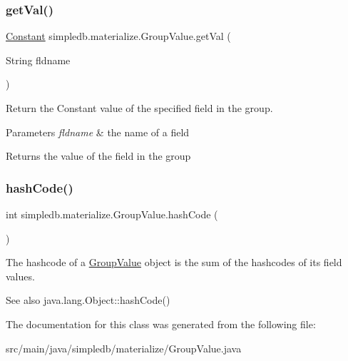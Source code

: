 \subsubsection{\texorpdfstring{get\+Val()}{getVal()}}
{\footnotesize\ttfamily \hyperlink{classsimpledb_1_1query_1_1Constant}{Constant} simpledb.\+materialize.\+Group\+Value.\+get\+Val (\begin{DoxyParamCaption}\item[{String}]{fldname }\end{DoxyParamCaption})\hspace{0.3cm}{\ttfamily [inline]}}

Return the Constant value of the specified field in the group. 
\begin{DoxyParams}{Parameters}
{\em fldname} & the name of a field \\
\hline
\end{DoxyParams}
\begin{DoxyReturn}{Returns}
the value of the field in the group 
\end{DoxyReturn}
\mbox{\label{classsimpledb_1_1materialize_1_1GroupValue_a5a18a858cd82fe9c59399975447de206}} 
\subsubsection{\texorpdfstring{hash\+Code()}{hashCode()}}
{\footnotesize\ttfamily int simpledb.\+materialize.\+Group\+Value.\+hash\+Code (\begin{DoxyParamCaption}{ }\end{DoxyParamCaption})\hspace{0.3cm}{\ttfamily [inline]}}

The hashcode of a \hyperlink{classsimpledb_1_1materialize_1_1GroupValue}{Group\+Value} object is the sum of the hashcodes of its field values. \begin{DoxySeeAlso}{See also}
java.\+lang.\+Object\+::hash\+Code() 
\end{DoxySeeAlso}


The documentation for this class was generated from the following file\+:\begin{DoxyCompactItemize}
\item 
src/main/java/simpledb/materialize/Group\+Value.\+java\end{DoxyCompactItemize}
